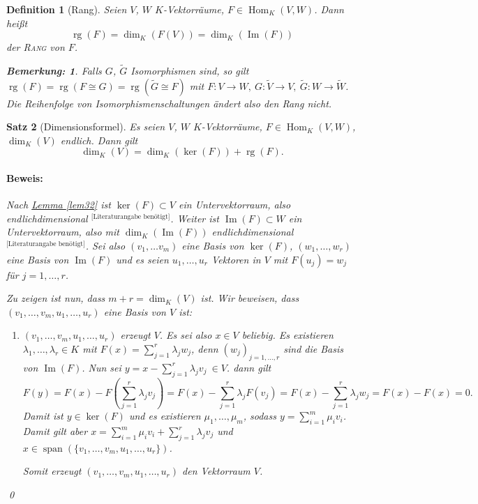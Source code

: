 \documentclass{report}
\newcommand{\IN}[1]{\index{#1|BH}}
\newcommand{\lb}{\lambda}
\DeclareMathOperator{\Span}{span}
\DeclareMathOperator{\Hom}{Hom}
\DeclareMathOperator{\Ima}{Im}
\DeclareMathOperator{\rg}{rg}
\theoremstyle{customrem}
\newtheorem*{bemerkung}{Bemerkung\textnormal:}
\theoremstyle{customdef}
\newtheorem{definition}{Definition}[chapter]
\newtheorem{satz}[definition]{Satz}
\renewenvironment{proof}{\paragraph{Beweis: }}{\qed}
\newcommand{\defemph}[1]{\textsc{#1}}
\begin{document}
	\begin{definition}[Rang]
		\IN{Rang}
		Seien $V$, $W$ $K$-Vektorräume, $F\in\Hom_K(V, W)$. Dann heißt $$\rg(F)=\dim_K(F(V)) = \dim_K(\Ima(F))$$ der \defemph{Rang} von $F$.\\
		\begin{bemerkung}
			Falls $G$, $\widetilde{G}$ Isomorphismen sind, so gilt $\rg(F) = \rg(F\cong G) = \rg(\widetilde{G}\cong F)$ mit $F:V\to W,\ G:\widetilde{V}\to V,\ \widetilde{G}: W\to\widetilde{W}$. Die Reihenfolge von Isomorphismenschaltungen ändert also den Rang nicht.\\
		\end{bemerkung}
	\end{definition}
	
	\begin{satz}[Dimensionsformel]
		\IN{Dimensionsformel}
		\label{satz37}
		Es seien $V$, $W$ $K$-Vektorräume, $F\in\Hom_K(V, W)$, $\dim_K(V)$ endlich. Dann gilt $$\dim_K(V) = \dim_K(\ker(F))+\rg(F).$$
		\begin{proof}
			Nach \hyperref[lem32]{Lemma \ref*{lem32}} ist $\ker(F)\subset V$ ein Untervektorraum, also endlichdimensional ${}^\text{[Literaturangabe benötigt]}$. Weiter ist $\Ima(F)\subset W$ ein Untervektorraum, also mit $\dim_K(\Ima(F))$ endlichdimensional ${}^\text{[Literaturangabe benötigt]}$. Sei also $(v_1, \ldots v_m)$ eine Basis von $\ker(F)$, $(w_1,\ldots, w_r)$ eine Basis von $\Ima(F)$ und es seien $u_1,\ldots, u_r$ Vektoren in $V$ mit $F(u_j)=w_j$ für $j=1, \ldots, r$.
			
			Zu zeigen ist nun, dass $m+r=\dim_K(V)$ ist. Wir beweisen, dass $(v_1, \ldots, v_m, u_1, \ldots, u_r)$ eine Basis von $V$ ist:
			\begin{enumerate}
				\item $(v_1, \ldots, v_m, u_1, \ldots, u_r)$ erzeugt $V$. Es sei also $x\in V$ beliebig. Es existieren $\lb_1, \ldots, \lb_r\in K$ mit $F(x) = \sum_{j=1}^{r}\lb_j w_j$, denn $(w_j)_{j=1, \ldots, r}$ sind die Basis von $\Ima(F)$. Nun sei $y=x-\sum_{j=1}^{r}\lb_j v_j\ \in V$. dann gilt $$F(y) = F(x) - F\left(\sum_{j=1}^{r}\lb_j v_j\right) = F(x) - \sum_{j=1}^{r}\lb_j F(v_j)= F(x) - \sum_{j=1}^{r}\lb_j w_j = F(x)-F(x)=0.$$ Damit ist $y\in \ker(F)$ und es existieren $\mu_1, \ldots, \mu_m$, sodass $y=\sum_{i=1}^{m}\mu_i v_i$. Damit gilt aber $x=\sum_{i=1}^{m}\mu_iv_i + \sum_{j=1}^{r}\lb_jv_j$ und $x\in \Span(\{v_1, \ldots, v_m, u_1, \ldots, u_r\})$. 
				
				Somit erzeugt $(v_1, \ldots, v_m, u_1, \ldots, u_r)$ den Vektorraum $V$.
				

\end{enumerate}
\end{proof}
\end{satz}
\end{document}
